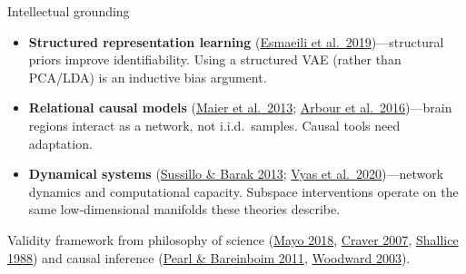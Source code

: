 \documentclass[aspectratio=169,11pt]{beamer}
\begin{document}
\begin{frame}{Intellectual grounding}
\begin{itemize}\setlength\itemsep{3pt}
  \item {\small \textbf{Structured representation learning} (\href{https://proceedings.mlr.press/v89/esmaeili19a}{Esmaeili et al.\ 2019})---structural priors improve identifiability. Using a structured VAE (rather than PCA/LDA) is an inductive bias argument.}
  \item {\small \textbf{Relational causal models} (\href{https://arxiv.org/abs/1309.6843}{Maier et al.\ 2013}; \href{https://www.auai.org/uai2016/proceedings/papers/217.pdf}{Arbour et al.\ 2016})---brain regions interact as a network, not i.i.d.\ samples. Causal tools need adaptation.}
  \item {\small \textbf{Dynamical systems} (\href{https://doi.org/10.1162/NECO_a_00409}{Sussillo \& Barak 2013}; \href{https://doi.org/10.1146/annurev-neuro-092619-094115}{Vyas et al.\ 2020})---network dynamics and computational capacity. Subspace interventions operate on the same low-dimensional manifolds these theories describe.}
\end{itemize}

\vspace{0.3em}
{\small Validity framework from philosophy of science (\href{https://doi.org/10.1017/9781107286184}{Mayo 2018}, \href{https://doi.org/10.1093/acprof:oso/9780199299317.001.0001}{Craver 2007}, \href{https://doi.org/10.1017/CBO9780511526817}{Shallice 1988}) and causal inference (\href{https://arxiv.org/abs/1203.3519}{Pearl \& Bareinboim 2011}, \href{https://doi.org/10.1093/0195155270.001.0001}{Woodward 2003}).}
\end{frame}


\begin{frame}[plain]
\vfill
\begin{center}
  \setlength{\fboxrule}{2.5pt}%
\end{center}
\vfill
\end{frame}
\end{document}
